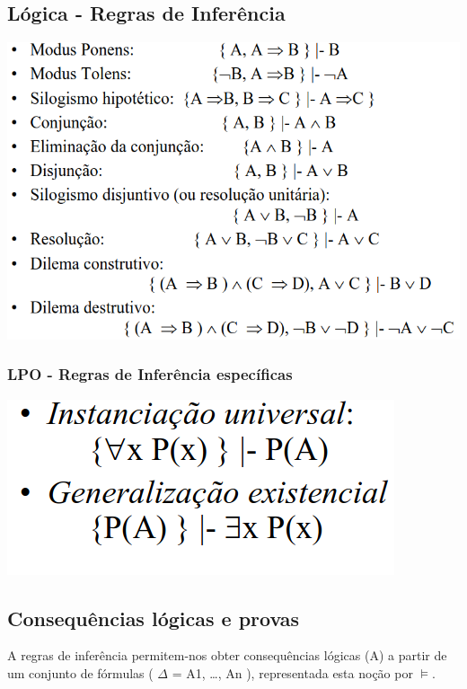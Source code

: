 \documentclass{article}
\begin{document}
\pagebreak

\subsection{Lógica - Regras de Inferência}

\begin{center}
  \includegraphics[scale=0.35]{35}
\end{center}

\subsubsection{LPO - Regras de Inferência específicas}

\begin{center}
  \includegraphics[scale=0.3]{36}
\end{center}

\subsection{Consequências lógicas e provas}

A regras de inferência permitem-nos obter consequências lógicas (A) a partir de um conjunto
de fórmulas ( $\Delta$ = { A1, \dots, An }), representada esta noção por $\vDash$.
\end{document}
